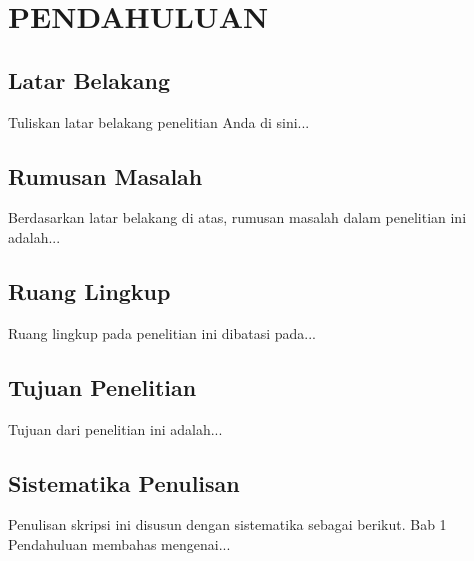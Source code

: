 \chapter{PENDAHULUAN}

\section{Latar Belakang}
Tuliskan latar belakang penelitian Anda di sini...

\section{Rumusan Masalah}
Berdasarkan latar belakang di atas, rumusan masalah dalam penelitian ini adalah...

\section{Ruang Lingkup}
Ruang lingkup pada penelitian ini dibatasi pada...

\section{Tujuan Penelitian}
Tujuan dari penelitian ini adalah...

\section{Sistematika Penulisan}
Penulisan skripsi ini disusun dengan sistematika sebagai berikut. Bab 1 Pendahuluan membahas mengenai...